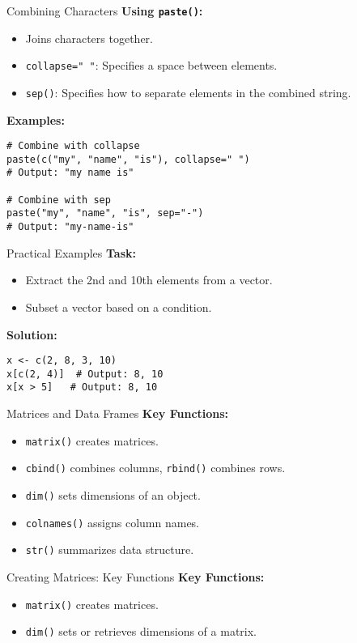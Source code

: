 \documentclass{beamer}
\begin{document}
\begin{frame}[fragile]{Combining Characters}
\textbf{Using \texttt{paste()}:}
\begin{itemize}
    \item Joins characters together.
    \item \texttt{collapse=" "}: Specifies a space between elements.
    \item \texttt{sep()}: Specifies how to separate elements in the combined string.
\end{itemize}
\textbf{Examples:}
\begin{verbatim}
# Combine with collapse
paste(c("my", "name", "is"), collapse=" ")
# Output: "my name is"

# Combine with sep
paste("my", "name", "is", sep="-")
# Output: "my-name-is"
\end{verbatim}
\end{frame}

\begin{frame}[fragile]{Practical Examples}
\textbf{Task:}
\begin{itemize}
    \item Extract the 2nd and 10th elements from a vector.
    \item Subset a vector based on a condition.
\end{itemize}
\textbf{Solution:}
\begin{verbatim}
x <- c(2, 8, 3, 10)
x[c(2, 4)]  # Output: 8, 10
x[x > 5]   # Output: 8, 10
\end{verbatim}
\end{frame}

\begin{frame}[fragile]{Matrices and Data Frames}
\textbf{Key Functions:}
\begin{itemize}
    \item \texttt{matrix()} creates matrices.
    \item \texttt{cbind()} combines columns, \texttt{rbind()} combines rows.
    \item \texttt{dim()} sets dimensions of an object.
    \item \texttt{colnames()} assigns column names.
    \item \texttt{str()} summarizes data structure.
\end{itemize}

\end{frame}


\begin{frame}[fragile]{Creating Matrices: Key Functions}
\textbf{Key Functions:}
\begin{itemize}
    \item \texttt{matrix()} creates matrices.
    \item \texttt{dim()} sets or retrieves dimensions of a matrix.
\end{itemize}
\end{frame}
\end{document}
